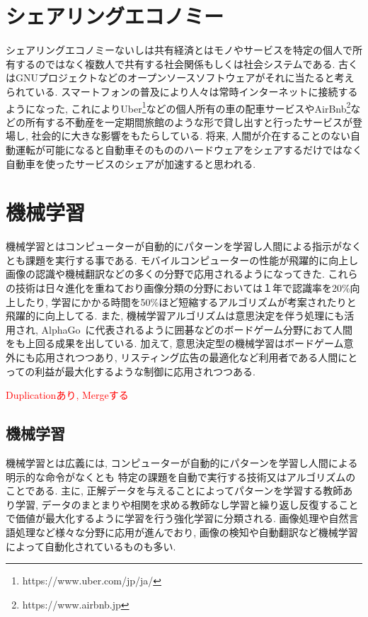 \section{シェアリングエコノミー}

シェアリングエコノミー\cite{Sharing}ないしは共有経済とはモノやサービスを特定の個人で所有するのではなく複数人で共有する社会関係もしくは社会システムである.
古くはGNUプロジェクトなどのオープンソースソフトウェアがそれに当たると考えられている.
スマートフォンの普及により人々は常時インターネットに接続するようになった, これによりUber\footnote[1]{https://www.uber.com/jp/ja/}などの個人所有の車の配車サービスやAirBnb\footnote[2]{https://www.airbnb.jp}などの所有する不動産を一定期間旅館のような形で貸し出すと行ったサービスが登場し,
社会的に大きな影響をもたらしている.
将来, 人間が介在することのない自動運転が可能になると自動車そのもののハードウェアをシェアするだけではなく自動車を使ったサービスのシェアが加速すると思われる.


\section{機械学習}

機械学習とはコンピューターが自動的にパターンを学習し人間による指示がなくとも課題を実行する事である.
モバイルコンピューターの性能が飛躍的に向上し画像の認識や機械翻訳などの多くの分野で応用されるようになってきた.
これらの技術は日々進化を重ねており画像分類の分野においては１年で認識率を20\%向上したり, 学習にかかる時間を50\%ほど短縮するアルゴリズムが考案されたりと飛躍的に向上してる.
また, 機械学習アルゴリズムは意思決定を伴う処理にも活用され, AlphaGo~\cite{AlphaGo}に代表されるように囲碁などのボードゲーム分野におて人間をも上回る成果を出している.
加えて, 意思決定型の機械学習はボードゲーム意外にも応用されつつあり, リスティング広告の最適化など利用者である人間にとっての利益が最大化するような制御に応用されつつある.


\textcolor{red}{Duplicationあり, Mergeする}


\subsection{機械学習}

機械学習とは広義には, コンピューターが自動的にパターンを学習し人間による明示的な命令がなくとも
特定の課題を自動で実行する技術又はアルゴリズムのことである. 主に, 正解データを与えることによってパターンを学習する教師あり学習,
データのまとまりや相関を求める教師なし学習と繰り返し反復することで価値が最大化するように学習を行う強化学習に分類される.
画像処理や自然言語処理など様々な分野に応用が進んでおり, 画像の検知や自動翻訳など機械学習によって自動化されているものも多い.



